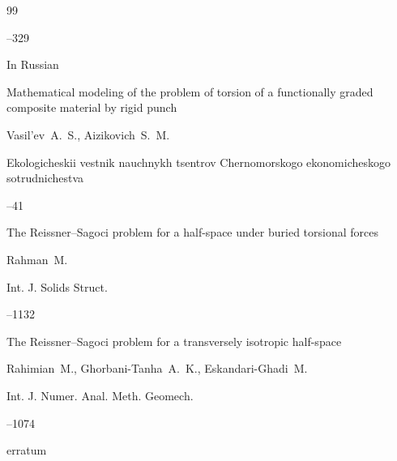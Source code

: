 \begin{thebibliography}{99}

--329





\lang In Russian

\paper Mathematical modeling of the problem of torsion of a functionally graded composite material by  rigid punch 

\by Vasil'ev~A.~S., Aizikovich~S.~M. 

\jour Ekologicheskii vestnik nauchnykh tsentrov Chernomorskogo ekonomicheskogo sotrudnichestva 



--41










\paper The Reissner--Sagoci problem for a half-space under buried torsional forces 

\by Rahman~M. 

\jour Int. J. Solids Struct. 




--1132





\paper The Reissner--Sagoci problem for a transversely isotropic half-space

\by Rahimian~M., Ghorbani-Tanha~A.~K., Eskandari-Ghadi~M. 

\jour Int. J. Numer. Anal. Meth. Geomech. 




--1074


\moreref

\paperinfo erratum





\end{thebibliography}
